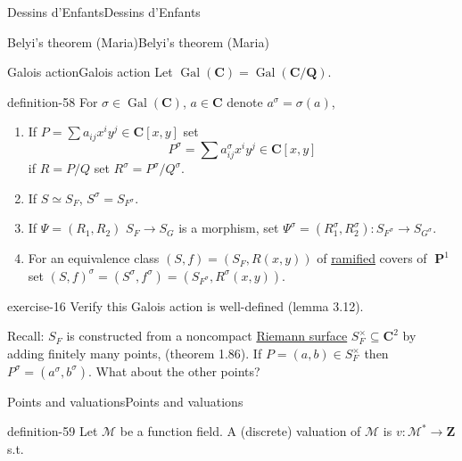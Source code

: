 \documentclass[10pt,]{book}
\numberwithin{equation}{section}
\newcommand{\lb}{[}
\newcommand{\rb}{]}
\newcommand{\ZZ}{\mathbf{Z}}
\newcommand{\QQ}{\mathbf{Q}}
\newcommand{\CC}{\mathbf{C}}
\newcommand{\Gal}[2]{\operatorname{Gal}(#1/#2)}
\DeclareMathOperator{\PP}{\mathbf{P}}
\begin{document}
\begin{chapterptx}{Dessins d'Enfants}{}{Dessins d'Enfants}{}{}
\begin{sectionptx}{Belyi's theorem (Maria)}{}{Belyi's theorem (Maria)}{}{}
\typeout{************************************************}
%
\begin{subsectionptx}{Galois action}{}{Galois action}{}{}\label{subsection-56}
\hypertarget{p-611}{}%
Let \(\operatorname{Gal}(\CC) = \Gal{\CC}{\QQ}\).%
\begin{definition}{}{definition-58}%
\hypertarget{p-612}{}%
For \(\sigma \in \operatorname{Gal}(\CC)\), \(a\in \CC\) denote \(a^\sigma = \sigma(a)\),\leavevmode%
\begin{enumerate}
\item\hypertarget{li-117}{}If \(P = \sum a_{ij} x^iy^j \in \CC\lb x,y\rb\) set%
\begin{equation*}
P^\sigma = \sum a^\sigma_{ij} x^iy^j \in \CC\lb x,y\rb
\end{equation*}
if \(R = P/Q\) set \(R^\sigma = P^\sigma / Q^\sigma\).%
\item\hypertarget{li-118}{}If \(S \simeq S_F\), \(S^\sigma = S_{F^\sigma}\).%
\item\hypertarget{li-119}{}If \(\Psi = (R_1, R_2)\) \(S_F\to S_G\) is a morphism, set \(\Psi^ \sigma = (R_1^\sigma , R_2 ^\sigma) \colon S_{F^\sigma} \to S_{G^\sigma}\).%
\item\hypertarget{li-120}{}For an equivalence class \((S,f) = (S_F, R(x,y))\) of \hyperref[def-dess-ramified]{ramified} covers of \(\PP^1\) set \((S,f)^\sigma = (S^\sigma, f^\sigma) = (S_{F^\sigma}, R^\sigma (x,y))\).%
\end{enumerate}
%
\end{definition}
\begin{inlineexercise}{}{exercise-16}%
\hypertarget{p-613}{}%
Verify this Galois action is well-defined (lemma 3.12).%
\end{inlineexercise}
\hypertarget{p-614}{}%
Recall: \(S_F\) is    constructed from a noncompact \hyperref[def-top-riem-surface]{Riemann surface} \(S_F^\times \subseteq \CC^2\) by adding finitely many points, (theorem 1.86). If \(P=  (a,b) \in S_F^\times\) then \(P^\sigma = (a^\sigma, b^\sigma)\). What about the other points?%
\end{subsectionptx}
%
%
\typeout{************************************************}
\typeout{************************************************}
%
\begin{subsectionptx}{Points and valuations}{}{Points and valuations}{}{}\label{subsection-57}
\begin{definition}{}{definition-59}%
\hypertarget{p-615}{}%
Let \(\mathcal M\) be a function field. A (discrete) valuation of \(\mathcal M\) is \(v \colon \mathcal M^* \to \ZZ\) s.t.\leavevmode%

\end{definition}
\end{subsectionptx}
\end{sectionptx}
\end{chapterptx}
\end{document}
